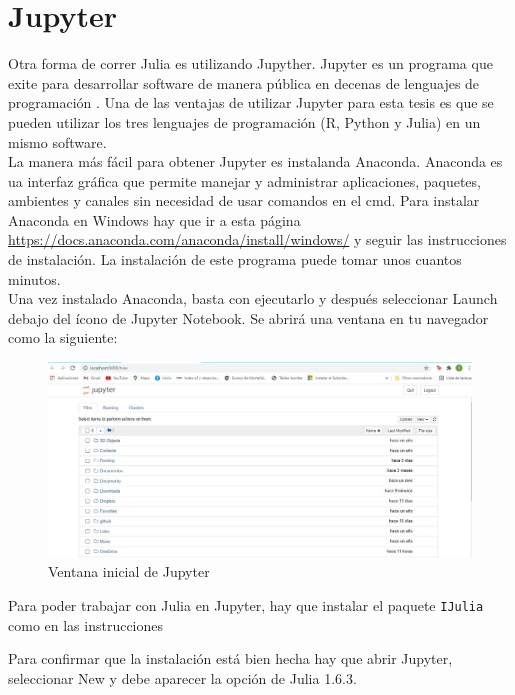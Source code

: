 \section{Jupyter}
Otra forma de correr Julia es utilizando Jupyther. Jupyter es un programa que exite para desarrollar software de manera pública en decenas de lenguajes de programación . Una de las ventajas de utilizar Jupyter para esta tesis es que se pueden utilizar los tres lenguajes de programación (R, Python y Julia) en un mismo software. 
\\
La manera más fácil para obtener Jupyter es instalanda Anaconda. Anaconda es ua interfaz gráfica que permite manejar y administrar aplicaciones, paquetes, ambientes y canales sin necesidad de usar comandos en el cmd. Para instalar Anaconda en Windows hay que ir a esta página \url{https://docs.anaconda.com/anaconda/install/windows/} y seguir las instrucciones de instalación. La instalación de este programa puede tomar unos cuantos minutos. 
\\
Una vez instalado Anaconda, basta con ejecutarlo y después seleccionar \textsf{Launch} debajo del ícono de Jupyter Notebook. Se abrirá una ventana en tu navegador como la siguiente: 

\begin{figure}[h]
\begin{center}
\includegraphics[scale=0.45]{Imagenes/inicio_jupyther.JPG}
 \caption{Ventana inicial de Jupyter}
  \label{main_jupyter}
\end{center}
\end{figure}

Para poder trabajar con Julia en Jupyter, hay que instalar el paquete \texttt{IJulia} como en las instrucciones %

Para confirmar que la instalación está bien hecha hay que abrir Jupyter, seleccionar \textsf{New} y debe aparecer la opción de \textsf{Julia 1.6.3}.


